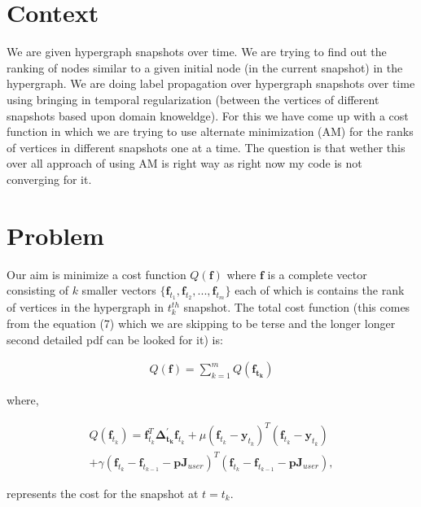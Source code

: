\documentclass[conference]{IEEEtran}
\begin{document}
\section{Context}

We are given hypergraph snapshots over time. We are trying to find out the ranking of nodes similar to a given initial node (in the current snapshot) in the hypergraph. We are doing label propagation over hypergraph snapshots over time using bringing in temporal regularization (between the vertices of different snapshots based upon domain knoweldge). For this we have come up with a cost function in which we are trying to use alternate minimization (AM) for the ranks of vertices in different snapshots one at a time. The question is that wether this over all approach of using AM is right way as right now my code is not converging for it.

\section{Problem}

Our aim is minimize a cost function $Q(\mathbf{f})$ where  $\mathbf{f}$ is a complete vector consisting of $k$ smaller vectors $\{ \mathbf{f}_{t_1},\mathbf{f}_{t_2}, ..., \mathbf{f}_{t_m}\}$ each of which is contains the rank of vertices in the hypergraph in $t_k^{th}$ snapshot. The total cost function (this comes from the equation (7) which we are skipping to be terse and the longer longer second detailed pdf can be looked for it) is:

\begin{equation}
\begin{align}
Q(\mathbf{f}) = \sum_{k=1}^{m} Q(\mathbf{f_{t_k}})
\end{align}
\end{equation}

where, 

\begin{equation}
\begin{align}
Q(\mathbf{f}_{t_k}) = \mathbf{f}_{t_k}^{T} \mathbf{\Delta^{'}_{t_k}} \mathbf{f}_{t_k} + \mu (\mathbf{f}_{t_k} - \mathbf{y}_{t_k})^{T} (\mathbf{f}_{t_k} - \mathbf{y}_{t_k}) \\ + \gamma (\mathbf{f}_{t_k} - \mathbf{f}_{t_{k-1}} - \mathbf{p} \mathbf{J}_{user})^{T} (\mathbf{f}_{t_k} - \mathbf{f}_{t_{k-1}} - \mathbf{p} \mathbf{J}_{user}), 
\end{align}
\end{equation}

represents the cost for the snapshot at $t=t_k$. 
\end{document}
